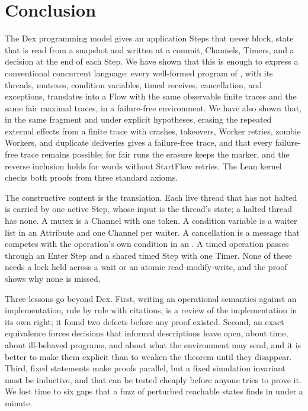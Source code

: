 \section{Conclusion}
\label{sec:conclusion}

The Dex programming model gives an application Steps that never block,
state that is read from a snapshot and written at a commit, Channels,
Timers, and a decision at the end of each Step. We have shown that this is
enough to express a conventional concurrent language: every well-formed
program of \Lang{}, with its threads, mutexes, condition variables, timed
receives, cancellation, and exceptions, translates into a Flow with the
same observable finite traces and the same fair maximal traces, in a
failure-free environment. We have also shown that, in the same fragment
and under explicit hypotheses, erasing the repeated external effects from
a finite trace with crashes, takeovers, Worker retries, zombie Workers, and
duplicate deliveries gives a failure-free trace, and that every
failure-free trace remains possible; for fair runs the erasure keeps the
marker, and the reverse inclusion holds for words without StartFlow
retries. The Lean kernel checks both proofs from three standard axioms.

The constructive content is the translation. Each live thread that has not
halted is carried by one active Step, whose input is the thread's state; a
halted thread has none. A mutex is a Channel with one token. A
condition variable is a waiter list in an Attribute and one Channel per
waiter. A cancellation is a message that competes with the operation's own
condition in an . A timed operation passes through an Enter Step
and a shared timed Step with one Timer.
None of these needs a lock held across a wait or an atomic
read-modify-write, and the proof shows why none is missed.

Three lessons go beyond Dex. First, writing an operational semantics
against an implementation, rule by rule with citations, is a review of the
implementation in its own right; it found two defects before any proof
existed. Second, an exact equivalence forces decisions that informal
descriptions leave open, about time, about ill-behaved programs, and about
what the environment may send, and it is better to make them explicit than
to weaken the theorem until they disappear. Third, fixed statements make
proofs parallel, but a fixed simulation invariant must be inductive, and
that can be tested cheaply before anyone tries to prove it. We lost time to
six gaps that a fuzz of perturbed reachable states finds in under a
minute.

